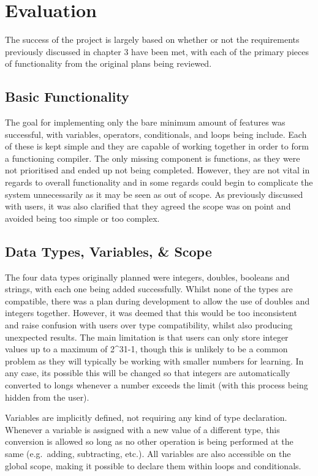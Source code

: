 \documentclass[
]{report}
\begin{document}
\chapter{Evaluation}
The success of the project is largely based on whether or not the
requirements previously discussed in chapter 3 have been met, with each
of the primary pieces of functionality from the original plans being
reviewed.

\section{Basic Functionality}
The goal for implementing only the bare minimum amount of features was
successful, with variables, operators, conditionals, and loops being
include. Each of these is kept simple and they are capable of working
together in order to form a functioning compiler. The only missing
component is functions, as they were not prioritised and ended up not
being completed. However, they are not vital in regards to overall
functionality and in some regards could begin to complicate the system
unnecessarily as it may be seen as out of scope. As previously discussed
with users, it was also clarified that they agreed the scope was on
point and avoided being too simple or too complex.

\section{Data Types, Variables, \& Scope}
The four data types originally planned were integers, doubles, booleans
and strings, with each one being added successfully. Whilst none of the
types are compatible, there was a plan during development to allow the
use of doubles and integers together. However, it was deemed that this
would be too inconsistent and raise confusion with users over type
compatibility, whilst also producing unexpected results. The main
limitation is that users can only store integer values up to a maximum
of 2\^{}31-1, though this is unlikely to be a common problem as they
will typically be working with smaller numbers for learning. In any
case, its possible this will be changed so that integers are
automatically converted to longs whenever a number exceeds the limit
(with this process being hidden from the user).

Variables are implicitly defined, not requiring any kind of type
declaration. Whenever a variable is assigned with a new value of a
different type, this conversion is allowed so long as no other operation
is being performed at the same (e.g.~adding, subtracting, etc.). All
variables are also accessible on the global scope, making it possible to
declare them within loops and conditionals.
\end{document}
